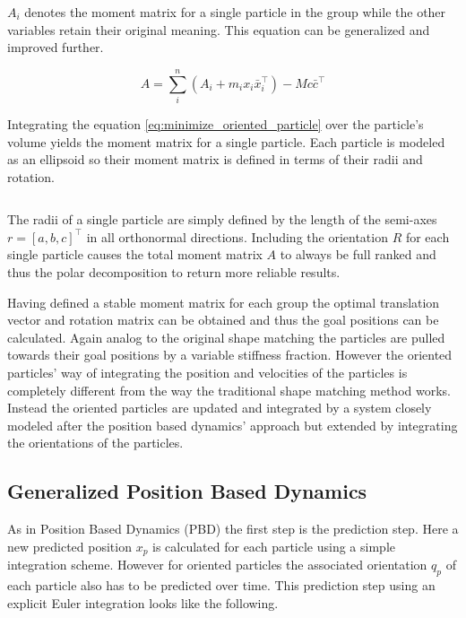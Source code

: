 $A_i$ denotes the moment matrix for a single particle in the group while the other variables retain their original meaning. This equation can be generalized and improved further.

\begin{equation}
A = \sum\limits_i^n (A_i + m_ix_i\bar{x}_i^\top) - Mc\bar{c}^\top
\end{equation}

Integrating the equation \ref{eq:minimize_oriented_particle} over the particle's volume yields the moment matrix for a single particle. Each particle is modeled as an ellipsoid so their moment matrix is defined in terms of their radii and rotation.

\begin{equation}
\end{equation}

The radii of a single particle are simply defined by the length of the semi-axes $r = [a,b,c]^\top$ in all orthonormal directions. Including the orientation $R$ for each single particle causes the total moment matrix $A$ to always be full ranked and thus the polar decomposition to return more reliable results.

Having defined a stable moment matrix for each group the optimal translation vector and rotation matrix can be obtained and thus the goal positions can be calculated. Again analog to the original shape matching the particles are pulled towards their goal positions by a variable stiffness fraction. However the oriented particles' way of integrating the position and velocities of the particles is completely different from the way the traditional shape matching method works. Instead the oriented particles are updated and integrated by a system closely modeled after the position based dynamics' approach but extended by integrating the orientations of the particles.

\subsection{Generalized Position Based Dynamics}
As in Position Based Dynamics (PBD) the first step is the prediction step. Here a new predicted position $x_p$ is calculated for each particle using a simple integration scheme. However for oriented particles the associated orientation $q_p$ of each particle also has to be predicted over time. This prediction step using an explicit Euler integration looks like the following.

